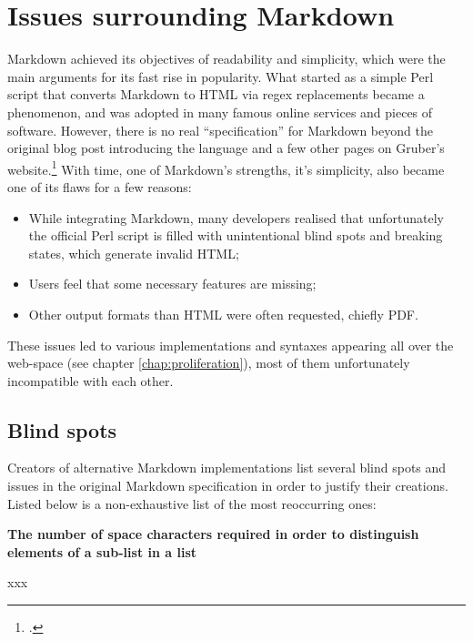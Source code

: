 \chapter{Issues surrounding Markdown}
\label{chap:issues}

\vspace{1cm}

Markdown achieved its objectives of readability and simplicity, which were the main arguments for its fast rise in popularity.
What started as a simple Perl script that converts Markdown to HTML via regex replacements became a phenomenon, and was adopted in many
famous online services and pieces of software. However, there is no real ``specification'' for Markdown beyond the original blog post
introducing the language and a few other pages on Gruber's website.\footcite{gruber2004markdown}
With time, one of Markdown's strengths, it's simplicity, also became one of its flaws for a few reasons:

\begin{itemize}
    \item While integrating Markdown, many developers realised that unfortunately the official Perl script is filled with unintentional
    blind spots and breaking states, which generate invalid HTML;
    \item Users feel that some necessary features are missing;
    \item Other output formats than HTML were often requested, chiefly PDF.
\end{itemize}

These issues led to various implementations and syntaxes appearing all over the web-space (see chapter \ref{chap:proliferation}),
most of them unfortunately incompatible with each other.

\section{Blind spots}

Creators of alternative Markdown implementations list several blind spots and issues in the original Markdown specification in order to
justify their creations. Listed below is a non-exhaustive list of the most reoccurring ones:\newline

\textbf{The number of space characters required in order to distinguish elements of a sub-list in a list}\newline

xxx\newline


